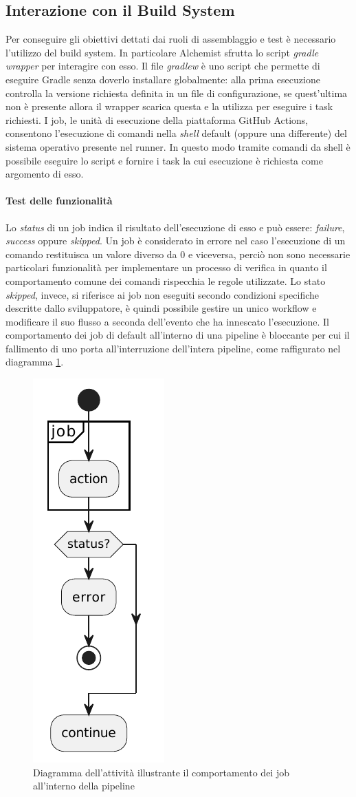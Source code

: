 \subsection{Interazione con il Build System}

Per conseguire gli obiettivi dettati dai ruoli di assemblaggio e test è necessario l'utilizzo del build system. In particolare Alchemist sfrutta lo script \textit{gradle wrapper} per interagire con esso. Il file \textit{gradlew} è uno script che permette di eseguire Gradle senza doverlo installare globalmente: alla prima esecuzione controlla la versione richiesta definita in un file di configurazione, se quest'ultima non è presente allora il wrapper scarica questa e la utilizza per eseguire i task richiesti. I job, le unità di esecuzione della piattaforma GitHub Actions, consentono l'esecuzione di comandi nella \textit{shell} default (oppure una differente) del sistema operativo presente nel runner. In questo modo tramite comandi da shell è possibile eseguire lo script e fornire i task la cui esecuzione è richiesta come argomento di esso.

\paragraph{Test delle funzionalità} Lo \textit{status} di un job indica il risultato dell'esecuzione di esso e può essere: \textit{failure}, \textit{success} oppure \textit{skipped}. Un job è considerato in errore nel caso l'esecuzione di un comando restituisca un valore diverso da 0 e viceversa, perciò non sono necessarie particolari funzionalità per implementare un processo di verifica in quanto il comportamento comune dei comandi rispecchia le regole utilizzate. Lo stato \textit{skipped}, invece, si riferisce ai job non eseguiti secondo condizioni specifiche descritte dallo sviluppatore, è quindi possibile gestire un unico workflow e modificare il suo flusso a seconda dell'evento che ha innescato l'esecuzione. Il comportamento dei job di default all'interno di una pipeline è bloccante per cui il fallimento di uno porta all'interruzione dell'intera pipeline, come raffigurato nel diagramma \cref{fig:activity-diagram-job}.
\begin{figure}[htb]
	\centering
	\includegraphics[width=.18\linewidth]{figures/activity-diagram-job.pdf}
	\caption{Diagramma dell'attività illustrante il comportamento dei job all'interno della pipeline}
	\label{fig:activity-diagram-job}
\end{figure}

